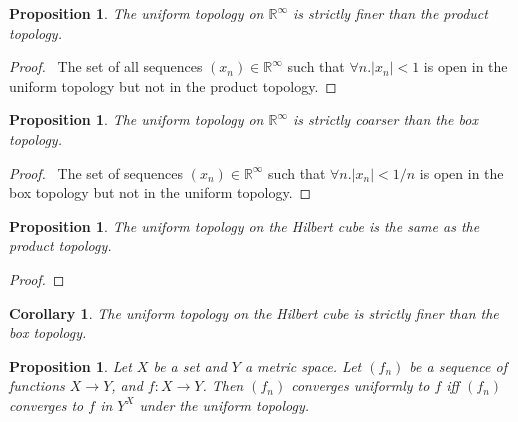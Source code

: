 \documentclass{book}
\let\qed\relax
\newtheorem{prop}[ax]{Proposition}
\newtheorem{cor}{Corollary}[ax]
\theoremstyle{definition}
\begin{document}
\begin{prop}
The uniform topology on $\mathbb{R}^\infty$ is strictly finer than the product topology.
\end{prop}

\begin{proof}
\pf\ The set of all sequences $(x_n) \in \mathbb{R}^\infty$ such that $\forall n. |x_n| < 1$ is open in the uniform topology but not in the product topology. \qed
\end{proof}

\begin{prop}
The uniform topology on $\mathbb{R}^\infty$ is strictly coarser than the box topology.
\end{prop}

\begin{proof}
\pf\ The set of sequences $(x_n) \in \mathbb{R}^\infty$ such that $\forall n. |x_n| < 1/n$ is open in the box topology but not in the uniform topology. \qed
\end{proof}

\begin{prop}
The uniform topology on the Hilbert cube is the same as the product topology.
\end{prop}

\begin{proof}
\pf
{}
\qed
\end{proof}

\begin{cor}
The uniform topology on the Hilbert cube is strictly finer than the box topology.
\end{cor}

\begin{prop}
Let $X$ be a set and $Y$ a metric space. Let $(f_n)$ be a sequence of functions $X \rightarrow Y$, and $f : X \rightarrow Y$. Then $(f_n)$ converges uniformly to $f$ iff $(f_n)$ converges to $f$ in $Y^X$ under the uniform topology.
\end{prop}
\end{document}
